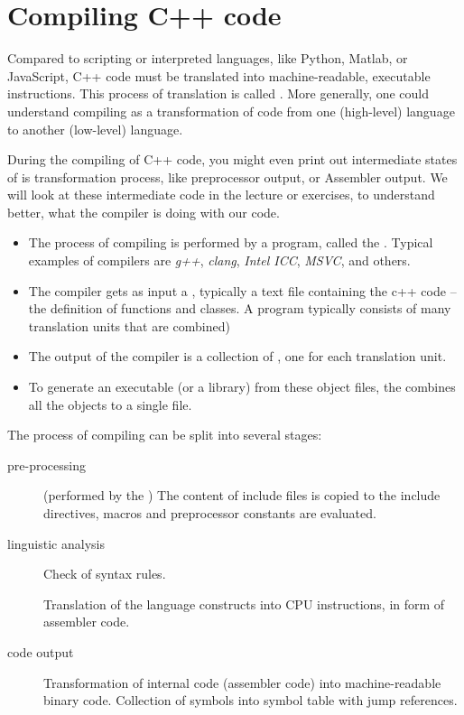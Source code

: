\section{Compiling C++ code\label{sec:compiling}}
Compared to scripting or interpreted languages, like Python, Matlab, or JavaScript, C++ code must be translated into machine-readable, executable instructions. This process of translation is called . More generally, one could understand compiling as a transformation of code
from one (high-level) language to another (low-level) language.

\begin{rem}
  During the compiling of C++ code, you might even print out intermediate states of is transformation process, like preprocessor output, or
  Assembler output. We will look at these intermediate code in the lecture or exercises, to understand better, what the compiler is doing with
  our code.
\end{rem}

\begin{itemize}
\item The process of compiling is performed by a program, called the . Typical examples of compilers are \emph{g++},
      \emph{clang}, \emph{Intel ICC}, \emph{MSVC}, and others.
\item The compiler gets as input a , typically a text file containing the c++ code -- the definition of functions and classes.
      A program typically consists of many translation units that are combined)
\item The output of the compiler is a collection of , one for each translation unit.
\item To generate an executable (or a library) from these object files, the  combines all the objects to a single file.
\end{itemize}

The process of compiling can be split into several stages:
\begin{description}
  \item[pre-processing] (performed by the ) The content of include files is copied to the include directives, macros and
  preprocessor constants are evaluated.
  \item[linguistic analysis] Check of syntax rules.
  \item[] Translation of the language constructs into CPU instructions, \eg in form of assembler code.
  \item[code output] Transformation of internal code (assembler code) into machine-readable binary code. Collection of symbols into
  symbol table with jump references.
\end{description}

